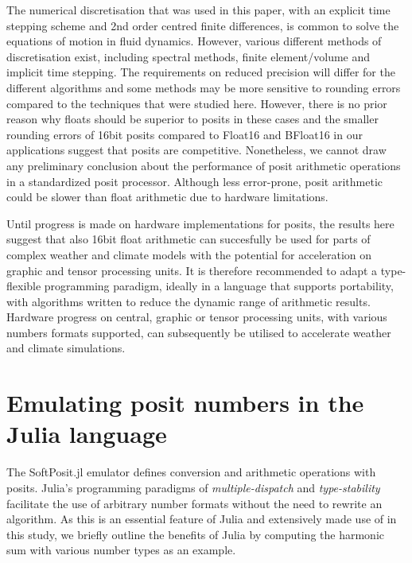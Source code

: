 \documentclass[draft]{agujournal2019}
\begin{document}
The numerical discretisation that was used in this paper, with an explicit time stepping scheme and 2nd order centred finite differences, is common to solve the equations of motion in fluid dynamics. However, various different methods of discretisation exist, including spectral methods, finite element/volume and implicit time stepping. The requirements on reduced precision will differ for the different algorithms and some methods may be more sensitive to rounding errors compared to the techniques that were studied here. However, there is no prior reason why floats should be superior to posits in these cases and the smaller rounding errors of 16bit posits compared to Float16 and BFloat16 in our applications suggest that posits are competitive. Nonetheless, we cannot draw any preliminary conclusion about the performance of posit arithmetic operations in a standardized posit processor. Although less error-prone, posit arithmetic could be slower than float arithmetic due to hardware limitations. 

Until progress is made on hardware implementations for posits, the results here suggest that also 16bit float arithmetic can succesfully be used for parts of complex weather and climate models with the potential for acceleration on graphic and tensor processing units. It is therefore recommended to adapt a type-flexible programming paradigm, ideally in a language that supports portability, with algorithms written to reduce the dynamic range of arithmetic results. Hardware progress on central, graphic or tensor processing units, with various numbers formats supported, can subsequently be utilised to accelerate weather and climate simulations.


\appendix
\section{Emulating posit numbers in the Julia language}
\label{sec:julia}

The SoftPosit.jl emulator defines conversion and arithmetic operations with posits. Julia's programming paradigms of \emph{multiple-dispatch} and \emph{type-stability} facilitate the use of arbitrary number formats without the need to rewrite an algorithm. As this is an essential feature of Julia and extensively made use of in this study, we briefly outline the benefits of Julia by computing the harmonic sum with various number types as an example.
\end{document}
